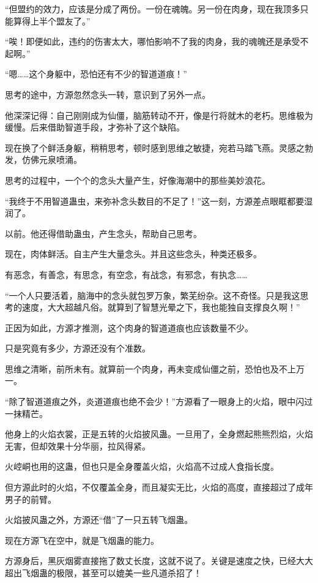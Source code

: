 \begin{this_body}
“但盟约的效力，应该是分成了两份。一份在魂魄。另一份在肉身，现在我顶多只能算得上半个盟友了。”

“唉！即便如此，违约的伤害太大，哪怕影响不了我的肉身，我的魂魄还是承受不起啊。”

“嗯……这个身躯中，恐怕还有不少的智道道痕！”

思考的途中，方源忽然念头一转，意识到了另外一点。

他深深记得：自己刚刚成为仙僵，脑筋转动不开，像是行将就木的老朽。思维极为缓慢。后来借助智道手段，才弥补了这个缺陷。

现在换了个鲜活身躯，稍稍思考，顿时感到思维之敏捷，宛若马踏飞燕。灵感之勃发，仿佛元泉喷涌。

思考的过程中，一个个的念头大量产生，好像海潮中的那些美妙浪花。

“我终于不用智道蛊虫，来弥补念头数目的不足了！”这一刻，方源差点眼眶都要湿润了。

以前。他还得借助蛊虫，产生念头，帮助自己思考。

现在，肉体鲜活。自主产生大量念头。并且这些念头，种类还极多。

有恶念，有善念，有思念，有空念，有战念，有邪念，有执念……

“一个人只要活着，脑海中的念头就包罗万象，繁芜纷杂。这不奇怪。只是我这思考的速度，大大超越凡俗。就算到了智慧光晕之下，我也能独自支撑良久啊！”

正因为如此，方源才推测，这个肉身的智道道痕也应该数量不少。

只是究竟有多少，方源还没有个准数。

思维之清晰，前所未有。就算前一个肉身，再未变成仙僵之前，恐怕也及不上万一。

“除了智道道痕之外，炎道道痕也绝不会少！”方源看了一眼身上的火焰，眼中闪过一抹精芒。

他身上的火焰衣裳，正是五转的火焰披风蛊。一旦用了，全身燃起熊熊烈焰，火焰无害，但却效果十分华丽，拉风得紧。

火崆峒也用的这蛊，但也只是全身覆盖火焰，火焰高不过成人食指长度。

但方源此时的火焰，不仅覆盖全身，而且凝实无比，火焰的高度，直接超过了成年男子的前臂。

火焰披风蛊之外，方源还“借”了一只五转飞烟蛊。

现在方源飞在空中，就是飞烟蛊的能力。

方源身后，黑灰烟雾直接拖了数丈长度，这就不说了。关键是速度之快，已经大大超出飞烟蛊的极限，甚至可以媲美一些凡道杀招了！


\end{this_body}
